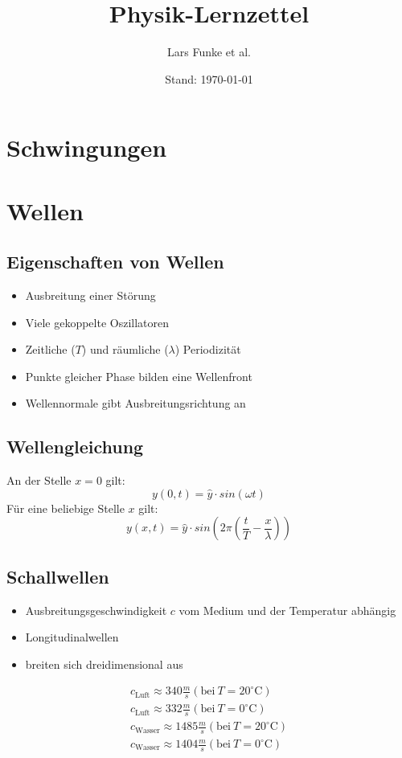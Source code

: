 \documentclass[12pt,a4paper,titlepage]{article}
\title{Physik-Lernzettel}
\author{Lars Funke et al.}
\date{Stand: \today}
\begin{document}
	\maketitle
	\tableofcontents
	\pagebreak
	\section{Schwingungen}
	\section{Wellen}
		\subsection{Eigenschaften von Wellen}
			\begin{itemize}
				\item Ausbreitung einer Störung
				\item Viele gekoppelte Oszillatoren
				\item Zeitliche ($T$) und räumliche ($\lambda$) Periodizität
				\item Punkte gleicher Phase bilden eine Wellenfront
				\item Wellennormale gibt Ausbreitungsrichtung an
			\end{itemize} 
		\subsection{Wellengleichung}
			An der Stelle $x = 0$ gilt:
			$$ y(0,t) = \hat{y} \cdot sin(\omega t)$$
			Für eine beliebige Stelle $x$ gilt:
			$$ y(x,t) = \hat{y} \cdot sin \left( 2 \pi \left( \frac{t}{T} - \frac{x}{\lambda} \right) \right) $$
		\subsection{Schallwellen}
			\begin{itemize}
				\item Ausbreitungsgeschwindigkeit $c$ vom Medium und der Temperatur abhängig
				\item Longitudinalwellen
				\item breiten sich dreidimensional aus
			\end{itemize}
			\begin{gather*}
				c_{\mathrm{Luft}} \approx 340 \frac{m}{s} (\mathrm{bei}\ T = 20^{\circ}\mathrm{C})\\
				c_{\mathrm{Luft}} \approx 332 \frac{m}{s} (\mathrm{bei}\ T = 0^{\circ}\mathrm{C})\\
				c_{\mathrm{Wasser}} \approx 1485 \frac{m}{s} (\mathrm{bei}\ T = 20^{\circ}\mathrm{C})\\
				c_{\mathrm{Wasser}} \approx 1404 \frac{m}{s} (\mathrm{bei}\ T = 0^{\circ}\mathrm{C})
			\end{gather*}
\end{document}
